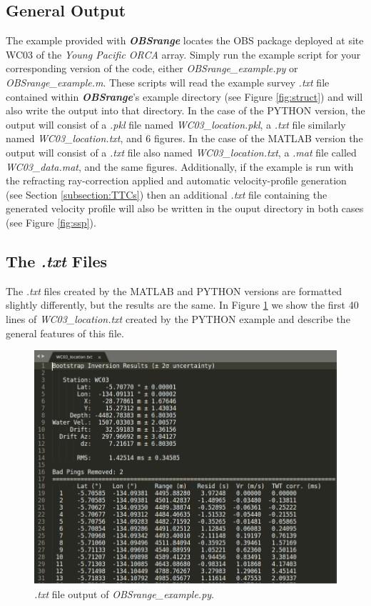 \documentclass[titlepage, 12pt]{article}
\begin{document}
  \subsection{General Output}
  The example provided with \textbf{\textit{OBSrange}} locates the OBS package deployed at site WC03 of the \textit{Young Pacific ORCA} array. Simply run the example script for your corresponding version of the code, either \textit{OBSrange\_example.py} or \textit{OBSrange\_example.m}. These scripts will read the example survey \textit{.txt} file contained within \textbf{\textit{OBSrange}}'s  example directory (see Figure \ref{fig:struct}) and will also write the output into that directory.  In the case of the PYTHON version, the output will consist of a \textit{.pkl} file named \textit{WC03\_location.pkl}, a \textit{.txt} file similarly named \textit{WC03\_location.txt}, and 6 figures. In the case of the MATLAB version the output will consist of a \textit{.txt} file also named \textit{WC03\_location.txt}, a \textit{.mat} file called \textit{WC03\_data.mat}, and the same figures. Additionally, if the example is run with the refracting ray-correction applied and automatic velocity-profile generation (see Section \ref{subsection:TTCs}) then an additional \textit{.txt} file containing the generated velocity profile will also be written in the ouput directory in both cases (see Figure \ref{fig:ssp}).

  \subsection{The \textit{.txt} Files}
  The \textit{.txt} files created by the MATLAB and PYTHON versions are formatted slightly differently, but the results are the same. In Figure \ref{fig:ex} we show the first 40 lines of \textit{WC03\_location.txt} created by the PYTHON example and describe the general features of this file.\\

  \begin{figure}[!htb]
   \includegraphics[width=\linewidth]{example_txt_fle.png}
   \caption{\textit{.txt} file output of \textit{OBSrange\_example.py}.}
   \label{fig:ex}
  \end{figure}
\end{document}
